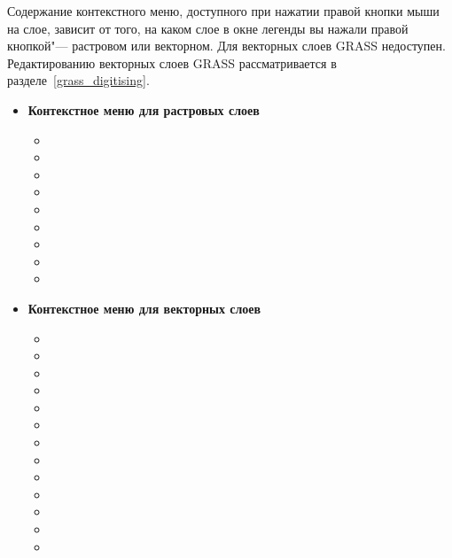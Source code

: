 Содержание контекстного меню, доступного при нажатии правой кнопки мыши
на слое, зависит от того, на каком слое в окне легенды вы нажали правой
кнопкой"--- растровом или векторном. Для векторных слоев GRASS
 недоступен. Редактированию векторных
слоев GRASS рассматривается в разделе~\ref{grass_digitising}.

\begin{itemize}

\item \textbf{Контекстное меню для растровых слоев}
\begin{itemize}
\item {}
\item {}
\item {}
\item {}
\item {}
\item {}
\item {}
\item {}
\item {}
\end{itemize}

\item \textbf{Контекстное меню для векторных слоев}
\begin{itemize}
\item {}
\item {}
\item {}
\item {}
\item {}
\item {}
\item {}
\item {}
\item {}
\item {}
\item {}
\item {}
\item {}
\end{itemize}


\end{itemize}
